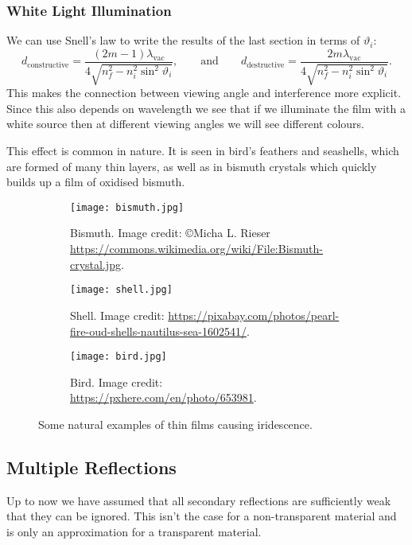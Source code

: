     \subsubsection{White Light Illumination}
    We can use Snell's law to write the results of the last section in terms of \(\vartheta_i\):
    \[d_{\mathrm{constructive}} = \frac{(2m - 1)\lambda_{\mathrm{vac}}}{4\sqrt{n_f^2 - n_i^2\sin^2\vartheta_i}}, \qquad\text{and}\qquad d_{\mathrm{destructive}} = \frac{2m\lambda_{\mathrm{vac}}}{4\sqrt{n_f^2 - n_i^2\sin^2\vartheta_i}}.\]
    This makes the connection between viewing angle and interference more explicit.
    Since this also depends on wavelength we see that if we illuminate the film with a white source then at different viewing angles we will see different colours.
    
    This effect is common in nature.
    It is seen in bird's feathers and seashells, which are formed of many thin layers, as well as in bismuth crystals which quickly builds up a film of oxidised bismuth.
    
    \begin{figure}[htb]
        \begin{subfigure}[t]{0.2\textwidth}
            \centering
            \texttt{[image: bismuth.jpg]}
            \caption{Bismuth. Image credit: \copyright{}Micha L. Rieser {\scriptsize \url{https://commons.wikimedia.org/wiki/File:Bismuth-crystal.jpg}.}}
        \end{subfigure}
        \begin{subfigure}[t]{0.4\textwidth}
            \centering
            \texttt{[image: shell.jpg]}
            \caption{Shell. Image credit: {\scriptsize \url{https://pixabay.com/photos/pearl-fire-oud-shells-nautilus-sea-1602541/}.}}
        \end{subfigure}
        \begin{subfigure}[t]{0.3\textwidth}
            \centering
            \texttt{[image: bird.jpg]}
            \caption{Bird. Image credit: {\scriptsize \url{https://pxhere.com/en/photo/653981}.}}
        \end{subfigure}
        \caption{Some natural examples of thin films causing iridescence.}
    \end{figure}

    \subsection{Multiple Reflections}
    Up to now we have assumed that all secondary reflections are sufficiently weak that they can be ignored.
    This isn't the case for a non-transparent material and is only an approximation for a transparent material.
    
